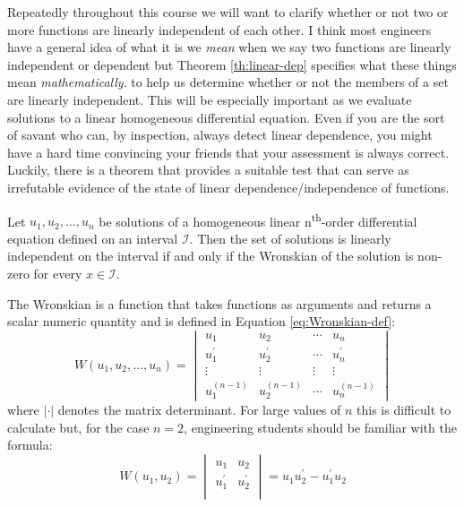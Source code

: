 Repeatedly throughout this course we will want to clarify whether or not two or more functions are linearly independent of each other.  I think most engineers have a general idea of what it is we \emph{mean} when we say two functions are linearly independent or dependent but Theorem \ref{th:linear-dep} specifies what these things mean \emph{mathematically}.  
 to help us determine whether or not the members of a set are linearly independent. This will be especially important as we evaluate solutions to a linear homogeneous differential equation.  Even if you are the sort of savant who can, by inspection, always detect linear dependence, you might have a hard time convincing your friends that your assessment is always correct.  Luckily, there is a theorem that provides a suitable test that can serve as irrefutable evidence of the state of linear dependence/independence of functions.

\begin{theorem}
Let $u_1,u_2,\dots,u_n$ be solutions of a homogeneous linear n\textsuperscript{th}-order differential equation defined on an interval $\mathcal{I}$.  Then the set of solutions is linearly independent on the interval if and only if the Wronskian of the solution is non-zero for every $x \in \mathcal{I}$.  
\end{theorem}
The Wronskian is a function that takes functions as arguments and returns a scalar numeric quantity and is defined in Equation \ref{eq:Wronskian-def}:\begin{equation}
W(u_1,u_2,\dots,u_n)=
\begin{vmatrix}
u_1 & u_2 & \cdots & u_n \\
u^{\prime}_1 & u^{\prime}_2 & \cdots & u^{\prime}_n \\
\vdots & \vdots & \vdots & \vdots \\
u^{(n-1)}_1 & u^{(n-1)}_2 & \cdots & u^{(n-1)}_n
\end{vmatrix}
\label{eq:Wronskian-def}
\end{equation}
where $|\cdot|$ denotes the matrix determinant.  For large values of $n$ this is difficult to calculate but, for the case $n=2$, engineering students should be familiar with the formula:
\begin{equation}
W(u_1,u_2) = 
\begin{vmatrix}
u_1 & u_2 \\
u^{\prime}_1 & u^{\prime}_2 \\
\end{vmatrix}
= u_1 u^{\prime}_2 - u^{\prime}_1 u_2
\end{equation}

